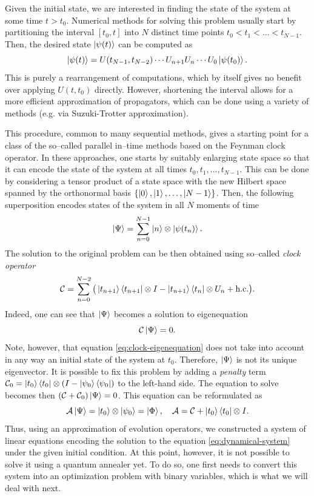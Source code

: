 Given the initial state, we are interested in finding the state of the
system at some time $t > t_0$. Numerical methods for solving this problem
usually start by partitioning the interval $[t_0, t]$ into $N$ distinct time
points $t_0 < t_1 < \ldots < t_{N-1}$. Then, the desired state $\ket{\psi(t)}$
can be computed as
%
\begin{equation}
\ket{\psi(t)} = U(t_{N-1}, t_{N-2}) \cdots U_{n+1}U_n \cdots U_0 \ket{\psi(t_0)}.
\end{equation}
%
This is purely a rearrangement of computations, which by itself gives no benefit
over applying $U(t, t_0)$ directly. However, shortening the interval allows for a more efficient approximation of propagators, which can be done using a variety of methods (e.g. via Suzuki-Trotter approximation).

This procedure, common to many sequential methods, gives a starting point for a class of the so--called parallel in--time methods based on the Feynman clock operator. In these approaches, one starts by suitably enlarging state space so that it can encode the state of the system at all times $t_0, t_1, \ldots, t_{N-1}$. This can be done by considering a tensor product of a state space with the new Hilbert space spanned by the orthonormal basis $\{\ket{0}, \ket{1}, \ldots, \ket{N-1}\}$. Then, the following superposition encodes states of the system in all $N$ moments of time
%
\begin{equation}
    \ket{\Psi} = \sum_{n=0}^{N-1} \ket{n} \otimes \ket{\psi(t_n)}.
\end{equation}
The solution to the original problem can be then obtained using so--called \emph{clock operator}
\begin{equation}
\label{eq:clock2}
 \mathcal{C}
   =
\sum_{n=0}^{N-2}
\big(
\ket{t_{n+1}}\bra{t_{n+1}} \otimes I - \ket{t_{n+1}}\bra{t_n} \otimes U_n
+ \text{h.c.}
\big).
\end{equation}
Indeed, one can see that $\ket{\Psi}$ becomes a solution to eigenequation
\begin{equation}
\label{eq:clock-eigenequation}
\mathcal{C} \ket{\Psi} = 0.
\end{equation}
Note, however, that equation \eqref{eq:clock-eigenequation} does not take into account in any way an initial state of the system at $t_0$. Therefore, $\ket{\Psi}$ is not its unique eigenvector. It is possible to fix this problem by adding a \emph{penalty} term $\mathcal{C}_0 = \ket{t_0}\bra{t_0}\otimes(I-\ket{\psi_0}\bra{\psi_0})$ to the left-hand side. The equation to solve becomes then $(\mathcal{C} + \mathcal{C}_0) \ket{\Psi} = 0$.
This equation can be reformulated as
\begin{equation}
\label{eq:gsys}
\mathcal{A} \ket{\Psi}
=
\ket{t_0}\otimes \ket{\psi_0} = \ket{\Phi},
\quad
\mathcal{A}=\mathcal{C} + \ket{t_0}\bra{t_0} \otimes I.
\end{equation}
Thus, using an approximation of evolution operators, we constructed a system of linear equations encoding the solution to the equation \eqref{eq:dynamical-system} under the given initial condition. At this point, however, it is not possible to solve it using a quantum annealer yet. To do so, one first needs to convert this system into an optimization problem
with binary variables, which is what we will deal with next.
